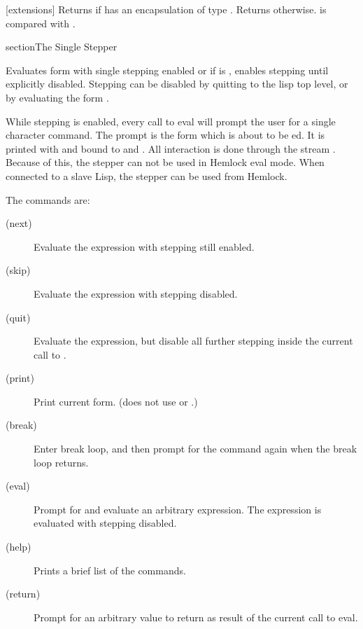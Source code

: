 [extensions]{}
Returns  if  has an encapsulation of type .
Returns \nil{} otherwise.   is compared with .
\enddefun


\begin{ignore}
section{The Single Stepper}

Evaluates form with single stepping enabled or if  is ,
enables stepping until explicitly disabled.  Stepping can be
disabled by quitting to the lisp top level, or by evaluating the form
.

While stepping is enabled, every call to eval will prompt the user for
a single character command.  The prompt is the form which is about to
be ed.  It is printed with  and
 bound to  and
.  All interaction is done through the stream
.  Because of this, the stepper can not be used in Hemlock
eval mode.  When connected to a slave Lisp, the stepper can be used
from Hemlock.

The commands are:
\begin{description}

\item[ (next)]
Evaluate the expression with stepping still enabled.

\item[ (skip)]
Evaluate the expression with stepping disabled.

\item[ (quit)]
Evaluate the expression, but disable all further
stepping inside the current call to .

\item[ (print)]
Print current form.  (does not use
 or .)

\item[ (break)]
Enter break loop, and then prompt for the command
again when the break loop returns.

\item[ (eval)]
Prompt for and evaluate an arbitrary expression.
The expression is evaluated with stepping disabled.

\item[ (help)]
Prints a brief list of the commands.

\item[ (return)]
Prompt for an arbitrary value to return as result
of the current call to eval.


\end{description}
\end{ignore}
